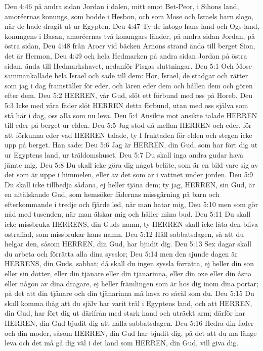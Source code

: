 Deu 4:46  på andra sidan Jordan i dalen, mitt emot Bet-Peor, i Sihons land, amoréernas konungs, som bodde i Hesbon, och som Mose och Israels barn slogo, när de hade dragit ut ur Egypten.
Deu 4:47  Ty de intogo hans land och Ogs land, konungens i Basan, amoréernas två konungars länder, på andra sidan Jordan, på östra sidan,
Deu 4:48  från Aroer vid bäcken Arnons strand ända till berget Sion, det är Hermon,
Deu 4:49  och hela Hedmarken på andra sidan Jordan på östra sidan, ända till Hedmarkshavet, nedanför Pisgas sluttningar.
Deu 5:1  Och Mose sammankallade hela Israel och sade till dem: Hör, Israel, de stadgar och rätter som jag i dag framställer för eder, och lären eder dem och hållen dem och gören efter dem.
Deu 5:2  HERREN, vår Gud, slöt ett förbund med oss på Horeb.
Deu 5:3  Icke med våra fäder slöt HERREN detta förbund, utan med oss själva som stå här i dag, oss alla som nu leva.
Deu 5:4  Ansikte mot ansikte talade HERREN till eder på berget ur elden.
Deu 5:5  Jag stod då mellan HERREN och eder, för att förkunna eder vad HERREN talade, ty I fruktaden för elden och stegen icke upp på berget. Han sade:
Deu 5:6  Jag är HERREN, din Gud, som har fört dig ut ur Egyptens land, ur träldomshuset.
Deu 5:7  Du skall inga andra gudar hava jämte mig.
Deu 5:8  Du skall icke göra dig något beläte, som är en bild vare sig av det som är uppe i himmelen, eller av det som är i vattnet under jorden.
Deu 5:9  Du skall icke tillbedja sådana, ej heller tjäna dem; ty jag, HERREN, sin Gud, är en nitälskande Gud, som hemsöker fädernas missgärning på barn och efterkommande i tredje och fjärde led, när man hatar mig,
Deu 5:10  men som gör nåd med tusenden, när man älskar mig och håller mina bud.
Deu 5:11  Du skall icke missbruka HERRENS, din Guds namn, ty HERREN skall icke låta den bliva ostraffad, som missbrukar hans namn.
Deu 5:12  Håll sabbatsdagen, så att du helgar den, såsom HERREN, din Gud, har bjudit dig.
Deu 5:13  Sex dagar skall du arbeta och förrätta alla dina sysslor;
Deu 5:14  men den sjunde dagen är HERRENS, din Guds, sabbat; då skall du ingen syssla förrätta, ej heller din son eller sin dotter, eller din tjänare eller din tjänarinna, eller din oxe eller din åsna eller någon av dina dragare, ej heller främlingen som är hos dig inom dina portar; på det att din tjänare och din tjänarinna må hava ro såväl som du.
Deu 5:15  Du skall komma ihåg att du själv har varit träl i Egyptens land, och att HERREN, din Gud, har fört dig ut därifrån med stark hand och uträckt arm; därför har HERREN, din Gud bjudit dig att hålla sabbatsdagen.
Deu 5:16  Hedra din fader och din moder, såsom HERREN, din Gud har bjudit dig, på det att du må länge leva och det må gå dig väl i det land som HERREN, din Gud, vill giva dig.
